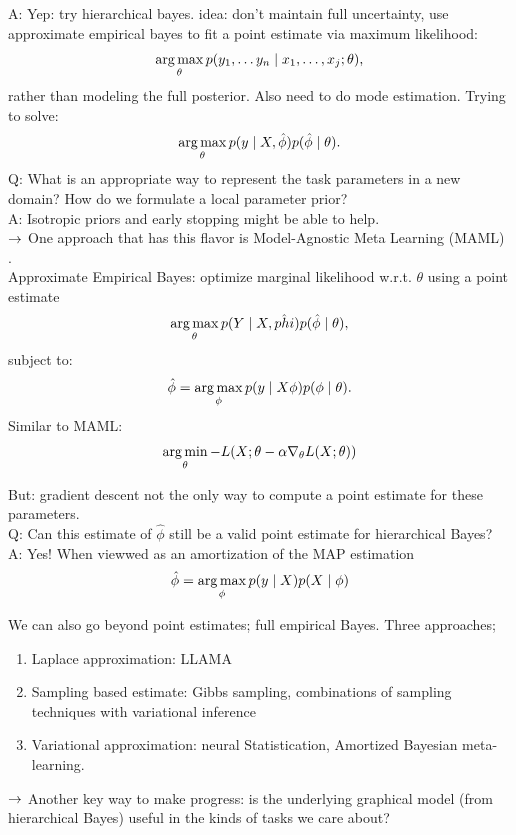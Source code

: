 A: Yep: try hierarchical bayes. idea: don't maintain full uncertainty, use approximate empirical bayes to fit a point estimate via maximum likelihood:
\[
\operatorname*{arg\,max}_{\theta} p(y_1, \ldots y_n \mid x_1, \ldots, x_j; \theta),
\]
rather than modeling the full posterior. Also need to do mode estimation. Trying to solve:
\[
\operatorname*{arg\,max}_{\theta} p(y \mid X, \hat{\phi}) p(\hat{\phi} \mid \theta).
\]
Q: What is an appropriate way to represent the task parameters in a new domain? How do we formulate a local parameter prior?\\

A: Isotropic priors and early stopping might be able to help. \\

$\rightarrow$ One approach that has this flavor is Model-Agnostic Meta Learning (MAML) \cite{finn2017model}. \\

Approximate Empirical Bayes: optimize marginal likelihood w.r.t. $\theta$ using a point estimate
\[
\operatorname*{arg\,max}_\theta p(Y \mid X, \hat{phi}) p(\hat{\phi} \mid \theta),
\]
subject to:
\[
\hat{\phi} = \operatorname*{arg\,max}_\phi p(y \mid X \phi) p(\phi \mid \theta).
\]
Similar to MAML:
\[
\operatorname*{arg\,min}_\theta - L(X; \theta-\alpha\nabla_\theta L(X; \theta))
\]

But: gradient descent not the only way to compute a point estimate for these parameters. \\

Q: Can this estimate of $\hat{\phi}$ still be a valid point estimate for hierarchical Bayes?\\

A: Yes! When viewwed as an amortization of the MAP estimation
\[
\hat{\phi} = \operatorname*{arg\,max}_\phi p(y \mid X) p(X \mid \phi)
\]

We can also go beyond point estimates; full empirical Bayes. Three approaches;
\begin{enumerate}
    \item Laplace approximation: LLAMA \cite{grant2018recasting}
    \item Sampling based estimate: Gibbs sampling, combinations of sampling techniques with variational inference
    \item Variational approximation: neural Statistication, Amortized Bayesian meta-learning.
\end{enumerate}

$\rightarrow$ Another key way to make progress: is the underlying graphical model (from hierarchical Bayes) useful in the kinds of tasks we care about? \\

